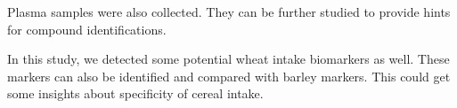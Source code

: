 Plasma samples were also collected. They can be further studied to provide hints for compound identifications.
 
In this study, we detected some potential wheat intake biomarkers as well. 
These markers can also be identified and compared with barley markers. 
This could get some insights about specificity of cereal intake.